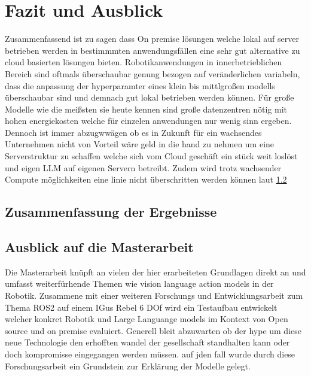\chapter{Fazit und Ausblick}

Zusammenfassend ist zu sagen dass On premise lösungen welche lokal auf server betrieben werden in bestimmmten anwendungsfällen eine sehr gut alternative zu cloud basierten lösungen bieten. Robotikanwendungen in innerbetrieblichen Bereich sind oftmals überschaubar genung bezogen auf veränderlichen variabeln, dass die anpassung der hyperparamter eines klein bis mittlgroßen modells überschaubar sind und demnach gut lokal betrieben werden können. Für große Modelle wie die meißsten sie heute kennen sind große datenzentren nötig mit hohen energiekosten welche für einzelen anwendungen nur wenig sinn ergeben. Dennoch ist immer abzugwwägen ob es in Zukunft für ein wachsendes Unternehmen nicht von Vorteil wäre geld in die hand zu nehmen um eine Serverstruktur zu schaffen welche sich vom Cloud geschäft ein stück weit loslöst und eigen LLM auf eigenen Servern betreibt. Zudem wird trotz wachsender Compute möglichkeiten eine linie nicht überschritten werden können laut \ref{} 


\section{Zusammenfassung der Ergebnisse}

\section{Ausblick auf die Masterarbeit}
Die Masterarbeit knüpft an vielen der hier erarbeiteten Grundlagen direkt an und umfasst weiterfürhende Themen wie vision language action models in der Robotik. Zusammene mit einer weiteren Forschungs und Entwicklungsarbeit zum Thema ROS2 auf einem IGus Rebel 6 DOf wird ein Testaufbau entwickelt welcher konkret Robotik und Large Languange models im Kontext von Open source und on premise evaluiert.
Generell bleit abzuwarten ob der hype um diese neue Technologie den erhofften wandel der gesellschaft standhalten kann oder doch kompromisse eingegangen werden müssen. auf jden fall wurde durch diese Forschungsarbeit ein Grundstein zur Erklärung der Modelle gelegt.
